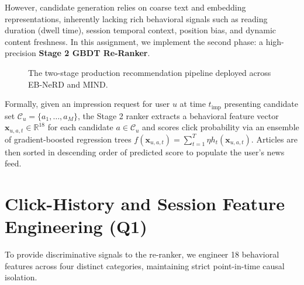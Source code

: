 \documentclass[11pt,a4paper]{article}
\begin{document}
However, candidate generation relies on coarse text and embedding representations, inherently lacking rich behavioral signals such as reading duration (dwell time), session temporal context, position bias, and dynamic content freshness. In this assignment, we implement the second phase: a high-precision \textbf{Stage 2 GBDT Re-Ranker}.

\begin{figure}[htbp]
\centering
\vspace{-0.3em}
\vspace{-0.2em}
\caption{The two-stage production recommendation pipeline deployed across EB-NeRD and MIND.}
\label{fig:pipeline}
\end{figure}

Formally, given an impression request for user $u$ at time $t_{\text{imp}}$ presenting candidate set $\mathcal{C}_u = \{a_1, \dots, a_M\}$, the Stage 2 ranker extracts a behavioral feature vector $\mathbf{x}_{u, a, t} \in \mathbb{R}^{18}$ for each candidate $a \in \mathcal{C}_u$ and scores click probability via an ensemble of gradient-boosted regression trees $f(\mathbf{x}_{u, a, t}) = \sum_{t=1}^T \eta h_t(\mathbf{x}_{u, a, t})$. Articles are then sorted in descending order of predicted score to populate the user's news feed.

\section{Click-History and Session Feature Engineering (Q1)}

To provide discriminative signals to the re-ranker, we engineer 18 behavioral features across four distinct categories, maintaining strict point-in-time causal isolation.
\end{document}
